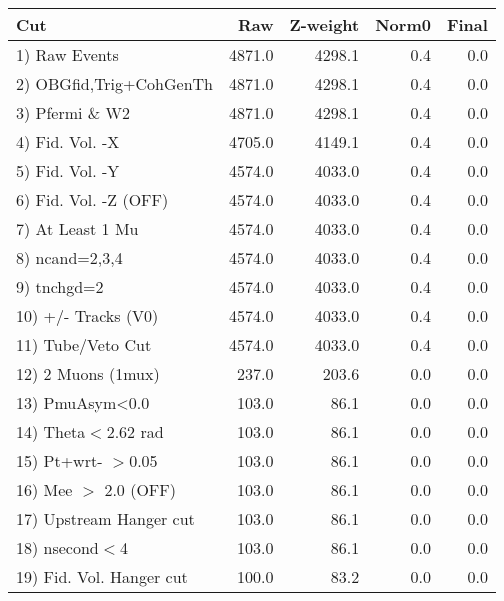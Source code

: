  \begin{table}[h!]\centering
 \begin{tabular}{||l||r|r|r|r||}
 \hline
 \hline
 Cut & Raw & Z-weight & Norm0 & Final \\
 \hline
  1) Raw Events           &      4871.0 &      4298.1 &         0.4 &         0.0 \\
  2) OBGfid,Trig+CohGenTh &      4871.0 &      4298.1 &         0.4 &         0.0 \\
  3) Pfermi \& W2         &      4871.0 &      4298.1 &         0.4 &         0.0 \\
  4) Fid. Vol. -X         &      4705.0 &      4149.1 &         0.4 &         0.0 \\
  5) Fid. Vol. -Y         &      4574.0 &      4033.0 &         0.4 &         0.0 \\
  6) Fid. Vol. -Z (OFF)   &      4574.0 &      4033.0 &         0.4 &         0.0 \\
  7) At Least 1 Mu        &      4574.0 &      4033.0 &         0.4 &         0.0 \\
  8) ncand=2,3,4          &      4574.0 &      4033.0 &         0.4 &         0.0 \\
  9) tnchgd=2             &      4574.0 &      4033.0 &         0.4 &         0.0 \\
 10) +/- Tracks (V0)      &      4574.0 &      4033.0 &         0.4 &         0.0 \\
 11) Tube/Veto Cut        &      4574.0 &      4033.0 &         0.4 &         0.0 \\
 12) 2 Muons (1mux)       &       237.0 &       203.6 &         0.0 &         0.0 \\
 13) PmuAsym<0.0          &       103.0 &        86.1 &         0.0 &         0.0 \\
 14) Theta$<$2.62 rad     &       103.0 &        86.1 &         0.0 &         0.0 \\
 15) Pt+wrt- $>$0.05      &       103.0 &        86.1 &         0.0 &         0.0 \\
 16) Mee $>$ 2.0  (OFF)   &       103.0 &        86.1 &         0.0 &         0.0 \\
 17) Upstream Hanger cut  &       103.0 &        86.1 &         0.0 &         0.0 \\
 18) nsecond$<$4          &       103.0 &        86.1 &         0.0 &         0.0 \\
 19) Fid. Vol. Hanger cut &       100.0 &        83.2 &         0.0 &         0.0 \\

\end{tabular}
\end{table}

